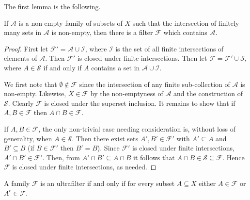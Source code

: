The first lemma is the following.
\begin{lemma}
\label{filter:1}
If \( \mathcal{A}  \) is a non-empty family of subsets of \( X \) such that the intersection of finitely many sets in \( \mathcal{A}   \) is non-empty, then there is a filter \( \mathcal{F}  \) which contains \( \mathcal{A} \).
\end{lemma}
\begin{proof}
First let \( \mathcal{F}' =  \mathcal{A} \cup \mathcal{I} \), where \( \mathcal{I} \) is the set of all finite intersections of elements of \( \mathcal{A}   \). Then \( \mathcal{F'}  \) is closed under finite intersections. Then let \( \mathcal{F} = \mathcal{F}' \cup \mathcal{S}  \), where \( A \in \mathcal{S}  \) if and only if \( A \) contains a set in \( \mathcal{A} \cup \mathcal{I}  \).

We first note that \( \emptyset \notin \mathcal{F} \) since the intersection of any finite sub-collection of \(\mathcal{A}   \) is non-empty. Likewise, \( X \in \mathcal{F}  \) by the non-emptyness of \( \mathcal{A}  \) and the construction of \( \mathcal{S}  \). Clearly \( \mathcal{F}  \) is closed under the superset inclusion. It remains to show that if \( A, B \in \mathcal{F}  \) then \( A \cap B \in \mathcal{F}  \). 

If \( A, B \in \mathcal{F}  \), the only non-trivial case needing consideration is, without loss of generality, when \( A \in \mathcal{S}  \). Then there exist sets \( A', B' \in \mathcal{F}' \) with \( A' \subseteq A \) and \( B' \subseteq B \) (if \( B \in \mathcal{F}' \) then \( B' = B \)). Since \( \mathcal{F} ' \) is closed under finite intersections, \( A' \cap B' \in \mathcal{F} ' \). Then, from \( A' \cap B' \subseteq A \cap B \) it follows that \( A \cap B \in \mathcal{S} \subseteq \mathcal{F}  \). Hence \( \mathcal{F}  \) is closed under finite intersections, as needed.
\end{proof}
\begin{lemma}
\label{filter:2}
A family \( \mathcal{F}  \) is an ultrafilter if and only if for every subset \( A \subseteq X \) either \( A \in \mathcal{F}  \) or \( A^{c} \in \mathcal{F}  \).
\end{lemma}
